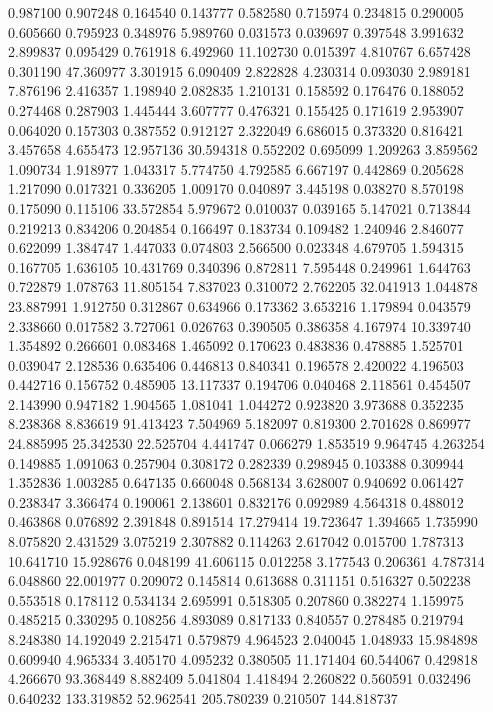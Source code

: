 0.987100
0.907248
0.164540
0.143777
0.582580
0.715974
0.234815
0.290005
0.605660
0.795923
0.348976
5.989760
0.031573
0.039697
0.397548
3.991632
2.899837
0.095429
0.761918
6.492960
11.102730
0.015397
4.810767
6.657428
0.301190
47.360977
3.301915
6.090409
2.822828
4.230314
0.093030
2.989181
7.876196
2.416357
1.198940
2.082835
1.210131
0.158592
0.176476
0.188052
0.274468
0.287903
1.445444
3.607777
0.476321
0.155425
0.171619
2.953907
0.064020
0.157303
0.387552
0.912127
2.322049
6.686015
0.373320
0.816421
3.457658
4.655473
12.957136
30.594318
0.552202
0.695099
1.209263
3.859562
1.090734
1.918977
1.043317
5.774750
4.792585
6.667197
0.442869
0.205628
1.217090
0.017321
0.336205
1.009170
0.040897
3.445198
0.038270
8.570198
0.175090
0.115106
33.572854
5.979672
0.010037
0.039165
5.147021
0.713844
0.219213
0.834206
0.204854
0.166497
0.183734
0.109482
1.240946
2.846077
0.622099
1.384747
1.447033
0.074803
2.566500
0.023348
4.679705
1.594315
0.167705
1.636105
10.431769
0.340396
0.872811
7.595448
0.249961
1.644763
0.722879
1.078763
11.805154
7.837023
0.310072
2.762205
32.041913
1.044878
23.887991
1.912750
0.312867
0.634966
0.173362
3.653216
1.179894
0.043579
2.338660
0.017582
3.727061
0.026763
0.390505
0.386358
4.167974
10.339740
1.354892
0.266601
0.083468
1.465092
0.170623
0.483836
0.478885
1.525701
0.039047
2.128536
0.635406
0.446813
0.840341
0.196578
2.420022
4.196503
0.442716
0.156752
0.485905
13.117337
0.194706
0.040468
2.118561
0.454507
2.143990
0.947182
1.904565
1.081041
1.044272
0.923820
3.973688
0.352235
8.238368
8.836619
91.413423
7.504969
5.182097
0.819300
2.701628
0.869977
24.885995
25.342530
22.525704
4.441747
0.066279
1.853519
9.964745
4.263254
0.149885
1.091063
0.257904
0.308172
0.282339
0.298945
0.103388
0.309944
1.352836
1.003285
0.647135
0.660048
0.568134
3.628007
0.940692
0.061427
0.238347
3.366474
0.190061
2.138601
0.832176
0.092989
4.564318
0.488012
0.463868
0.076892
2.391848
0.891514
17.279414
19.723647
1.394665
1.735990
8.075820
2.431529
3.075219
2.307882
0.114263
2.617042
0.015700
1.787313
10.641710
15.928676
0.048199
41.606115
0.012258
3.177543
0.206361
4.787314
6.048860
22.001977
0.209072
0.145814
0.613688
0.311151
0.516327
0.502238
0.553518
0.178112
0.534134
2.695991
0.518305
0.207860
0.382274
1.159975
0.485215
0.330295
0.108256
4.893089
0.817133
0.840557
0.278485
0.219794
8.248380
14.192049
2.215471
0.579879
4.964523
2.040045
1.048933
15.984898
0.609940
4.965334
3.405170
4.095232
0.380505
11.171404
60.544067
0.429818
4.266670
93.368449
8.882409
5.041804
1.418494
2.260822
0.560591
0.032496
0.640232
133.319852
52.962541
205.780239
0.210507
144.818737
